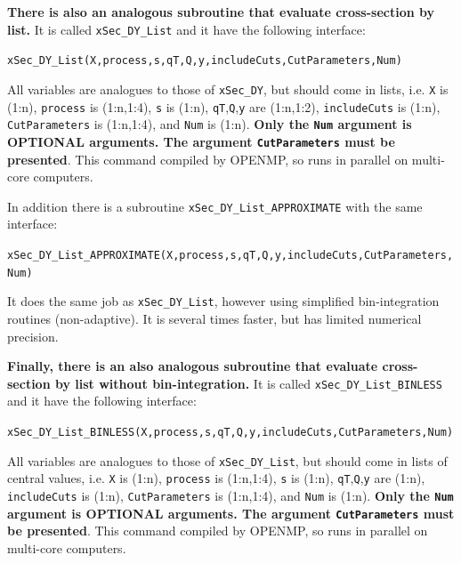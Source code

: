 \documentclass[prd,nofootinbib,eqsecnum,final]{revtex4}
\renewcommand{\(}{\left(}
\renewcommand{\)}{\right)}
\renewcommand{\[}{\left[}
\renewcommand{\]}{\right]}
\newcommand{\blue}[1]{{\color{blue} #1}}
\begin{document}
\begin{tcolorbox}
\textbf{\blue{There is also an analogous subroutine that evaluate cross-section by list.}} It is called \texttt{xSec\_DY\_List} and it have the following interface:
\begin{center}
\texttt{xSec\_DY\_List(X,process,s,qT,Q,y,includeCuts,CutParameters,Num)}
\end{center}
All variables are analogues to those of \texttt{xSec\_DY}, but should come in lists, i.e. \texttt{X} is (1:n), \texttt{process} is (1:n,1:4), \texttt{s} is (1:n), \texttt{qT},\texttt{Q},\texttt{y} are (1:n,1:2), \texttt{includeCuts} is (1:n), \texttt{CutParameters} is (1:n,1:4), and \texttt{Num} is (1:n). \textbf{Only the \texttt{Num} argument is OPTIONAL arguments. The argument \texttt{CutParameters} must be presented}. This command compiled by OPENMP, so runs in parallel on multi-core computers.

In addition there is a subroutine \texttt{xSec\_DY\_List\_APPROXIMATE} with the same interface:
\begin{center}
\texttt{xSec\_DY\_List\_APPROXIMATE(X,process,s,qT,Q,y,includeCuts,CutParameters,Num)}
\end{center}
It does the same job as \texttt{xSec\_DY\_List}, however using simplified bin-integration routines (non-adaptive). It is several times faster, but has limited numerical precision.
\end{tcolorbox}

\begin{tcolorbox}
\textbf{Finally, \blue{there is an also analogous subroutine that evaluate cross-section by list without bin-integration.}} It is called \texttt{xSec\_DY\_List\_BINLESS} and it have the following interface:

\begin{center}
\texttt{xSec\_DY\_List\_BINLESS(X,process,s,qT,Q,y,includeCuts,CutParameters,Num)}
\end{center}
All variables are analogues to those of \texttt{xSec\_DY\_List}, but should come in lists of central values, i.e. \texttt{X} is (1:n), \texttt{process} is (1:n,1:4), \texttt{s} is (1:n), \texttt{qT},\texttt{Q},\texttt{y} \blue{are (1:n)}, \texttt{includeCuts} is (1:n), \texttt{CutParameters} is (1:n,1:4), and \texttt{Num} is (1:n). \textbf{Only the \texttt{Num} argument is OPTIONAL arguments. The argument \texttt{CutParameters} must be presented}. This command compiled by OPENMP, so runs in parallel on multi-core computers.
\end{tcolorbox}
\end{document}
